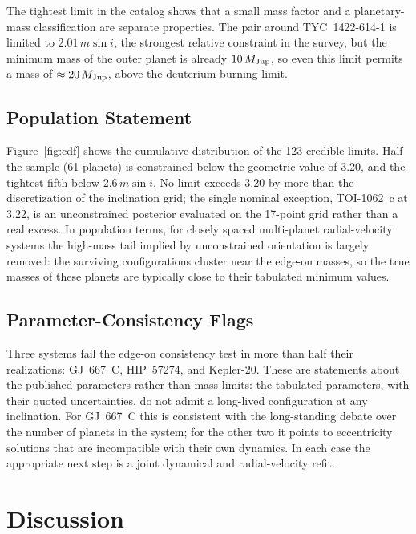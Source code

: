 \documentclass[twocolumn]{aastex631}
\newcommand{\msini}{m\sin i}
\newcommand{\mjup}{M_{\rm Jup}}
\begin{document}
The tightest limit in the catalog shows that a small mass factor and a
planetary-mass classification are separate properties. The pair around
TYC~1422-614-1 is limited to $2.01\,\msini$, the strongest relative
constraint in the survey, but the minimum mass of the outer planet is
already $10\,\mjup$, so even this limit permits a mass of
$\approx 20\,\mjup$, above the deuterium-burning limit.

\subsection{Population Statement} \label{sec:population}

Figure~\ref{fig:cdf} shows the cumulative distribution of the 123 credible
limits. Half the sample (61 planets) is constrained below the geometric
value of 3.20, and the tightest fifth below $2.6\,\msini$. No limit
exceeds 3.20 by more than the discretization of the inclination grid; the
single nominal exception, TOI-1062~c at 3.22, is an unconstrained
posterior evaluated on the 17-point grid rather than a real excess. In
population terms, for closely spaced multi-planet radial-velocity systems
the high-mass tail implied by unconstrained orientation is largely
removed: the surviving configurations cluster near the edge-on masses, so
the true masses of these planets are typically close to their tabulated
minimum values.

\subsection{Parameter-Consistency Flags} \label{sec:flags}

Three systems fail the edge-on consistency test in more than half their
realizations: GJ~667~C, HIP~57274, and Kepler-20. These are statements
about the published parameters rather than mass limits: the tabulated
parameters, with their quoted uncertainties, do not admit a long-lived
configuration at any inclination. For GJ~667~C this is consistent with the
long-standing debate over the number of planets in the system; for the
other two it points to eccentricity solutions that are incompatible with
their own dynamics. In each case the appropriate next step is a joint
dynamical and radial-velocity refit.

\section{Discussion} \label{sec:discussion}
\end{document}

